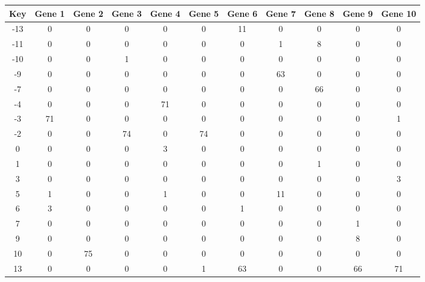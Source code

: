 \begin{tabular}{|c|c|c|c|c|c|c|c|c|c|c|}
\hline
Key & Gene 1 & Gene 2 & Gene 3 & Gene 4 & Gene 5 & Gene 6 & Gene 7 & Gene 8 & Gene 9 & Gene 10 \\
\hline
-13 & 0 & 0 & 0 & 0 & 0 & 11 & 0 & 0 & 0 & 0 \\
-11 & 0 & 0 & 0 & 0 & 0 & 0 & 1 & 8 & 0 & 0 \\
-10 & 0 & 0 & 1 & 0 & 0 & 0 & 0 & 0 & 0 & 0 \\
-9 & 0 & 0 & 0 & 0 & 0 & 0 & 63 & 0 & 0 & 0 \\
-7 & 0 & 0 & 0 & 0 & 0 & 0 & 0 & 66 & 0 & 0 \\
-4 & 0 & 0 & 0 & 71 & 0 & 0 & 0 & 0 & 0 & 0 \\
-3 & 71 & 0 & 0 & 0 & 0 & 0 & 0 & 0 & 0 & 1 \\
-2 & 0 & 0 & 74 & 0 & 74 & 0 & 0 & 0 & 0 & 0 \\
0 & 0 & 0 & 0 & 3 & 0 & 0 & 0 & 0 & 0 & 0 \\
1 & 0 & 0 & 0 & 0 & 0 & 0 & 0 & 1 & 0 & 0 \\
3 & 0 & 0 & 0 & 0 & 0 & 0 & 0 & 0 & 0 & 3 \\
5 & 1 & 0 & 0 & 1 & 0 & 0 & 11 & 0 & 0 & 0 \\
6 & 3 & 0 & 0 & 0 & 0 & 1 & 0 & 0 & 0 & 0 \\
7 & 0 & 0 & 0 & 0 & 0 & 0 & 0 & 0 & 1 & 0 \\
9 & 0 & 0 & 0 & 0 & 0 & 0 & 0 & 0 & 8 & 0 \\
10 & 0 & 75 & 0 & 0 & 0 & 0 & 0 & 0 & 0 & 0 \\
13 & 0 & 0 & 0 & 0 & 1 & 63 & 0 & 0 & 66 & 71 \\
\hline
\end{tabular}